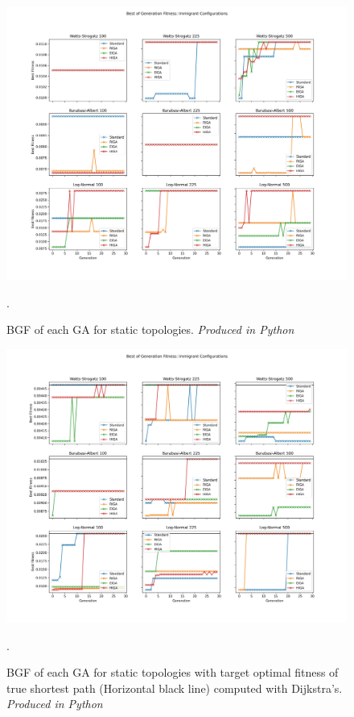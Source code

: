 \documentclass[
	a4paper, %
	10pt, %
	unnumberedsections, %
	twoside, %
]{LTJournalArticle}
\begin{document}
\begin{figure}
	\includegraphics[width=\linewidth]{Figures/sims/static/experiment_1.jpg}
	\caption{BGF of each GA for static topologies.  \emph{Produced in Python}}. 
	\label{fig:static_1}
\end{figure}

\begin{figure}
	\includegraphics[width=\linewidth]{Figures/sims/static/experiment_2.jpg}
	\caption{BGF of each GA for static topologies with target optimal fitness of true shortest path (Horizontal black line) computed with Dijkstra's. \emph{Produced in Python}}. 
	\label{fig:static_2}
\end{figure}
\end{document}
